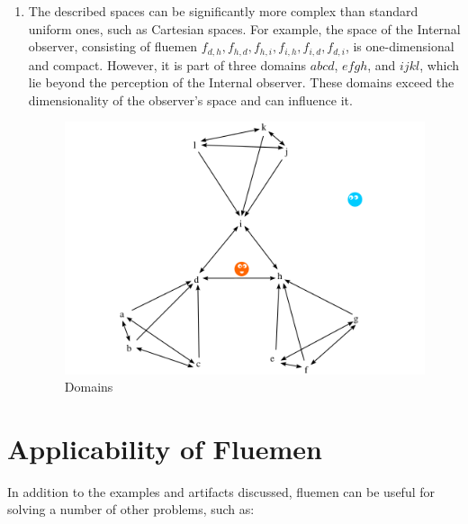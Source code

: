 \documentclass[final]{article}
\begin{document}
            \begin{enumerate}

                \item The described spaces can be significantly more complex 
                than standard uniform ones, such as Cartesian spaces. For 
                example, the space of the Internal observer, consisting of 
                fluemen \(f_{d,h}, f_{h,d}, f_{h,i}, f_{i,h}, f_{i,d}, 
                f_{d,i}\), is one-dimensional and compact. However, it is part 
                of three domains \(abcd\), \(efgh\), and \(ijkl\), which lie 
                beyond the perception of the Internal observer. These domains 
                exceed the dimensionality of the observer's space and can 
                influence it.

                \begin{figure}[H]
                    \centering
                    \includegraphics[width=\textwidth]{./domains.png}
                    \caption{Domains}
                    \label{fig:image}
                \end{figure}

            \end{enumerate}



    \section{Applicability of Fluemen}

        In addition to the examples and artifacts discussed, fluemen can be 
        useful for solving a number of other problems, such as:
\end{document}
